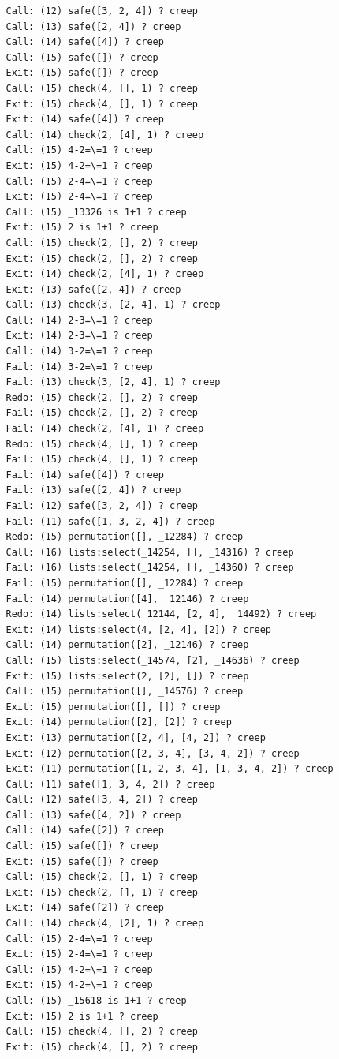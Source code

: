 \documentclass{article}
\begin{document}
\begin{verbatim}
   Call: (12) safe([3, 2, 4]) ? creep
   Call: (13) safe([2, 4]) ? creep
   Call: (14) safe([4]) ? creep
   Call: (15) safe([]) ? creep
   Exit: (15) safe([]) ? creep
   Call: (15) check(4, [], 1) ? creep
   Exit: (15) check(4, [], 1) ? creep
   Exit: (14) safe([4]) ? creep
   Call: (14) check(2, [4], 1) ? creep
   Call: (15) 4-2=\=1 ? creep
   Exit: (15) 4-2=\=1 ? creep
   Call: (15) 2-4=\=1 ? creep
   Exit: (15) 2-4=\=1 ? creep
   Call: (15) _13326 is 1+1 ? creep
   Exit: (15) 2 is 1+1 ? creep
   Call: (15) check(2, [], 2) ? creep
   Exit: (15) check(2, [], 2) ? creep
   Exit: (14) check(2, [4], 1) ? creep
   Exit: (13) safe([2, 4]) ? creep
   Call: (13) check(3, [2, 4], 1) ? creep
   Call: (14) 2-3=\=1 ? creep
   Exit: (14) 2-3=\=1 ? creep
   Call: (14) 3-2=\=1 ? creep
   Fail: (14) 3-2=\=1 ? creep
   Fail: (13) check(3, [2, 4], 1) ? creep
   Redo: (15) check(2, [], 2) ? creep
   Fail: (15) check(2, [], 2) ? creep
   Fail: (14) check(2, [4], 1) ? creep
   Redo: (15) check(4, [], 1) ? creep
   Fail: (15) check(4, [], 1) ? creep
   Fail: (14) safe([4]) ? creep
   Fail: (13) safe([2, 4]) ? creep
   Fail: (12) safe([3, 2, 4]) ? creep
   Fail: (11) safe([1, 3, 2, 4]) ? creep
   Redo: (15) permutation([], _12284) ? creep
   Call: (16) lists:select(_14254, [], _14316) ? creep
   Fail: (16) lists:select(_14254, [], _14360) ? creep
   Fail: (15) permutation([], _12284) ? creep
   Fail: (14) permutation([4], _12146) ? creep
   Redo: (14) lists:select(_12144, [2, 4], _14492) ? creep
   Exit: (14) lists:select(4, [2, 4], [2]) ? creep
   Call: (14) permutation([2], _12146) ? creep
   Call: (15) lists:select(_14574, [2], _14636) ? creep
   Exit: (15) lists:select(2, [2], []) ? creep
   Call: (15) permutation([], _14576) ? creep
   Exit: (15) permutation([], []) ? creep
   Exit: (14) permutation([2], [2]) ? creep
   Exit: (13) permutation([2, 4], [4, 2]) ? creep
   Exit: (12) permutation([2, 3, 4], [3, 4, 2]) ? creep
   Exit: (11) permutation([1, 2, 3, 4], [1, 3, 4, 2]) ? creep
   Call: (11) safe([1, 3, 4, 2]) ? creep
   Call: (12) safe([3, 4, 2]) ? creep
   Call: (13) safe([4, 2]) ? creep
   Call: (14) safe([2]) ? creep
   Call: (15) safe([]) ? creep
   Exit: (15) safe([]) ? creep
   Call: (15) check(2, [], 1) ? creep
   Exit: (15) check(2, [], 1) ? creep
   Exit: (14) safe([2]) ? creep
   Call: (14) check(4, [2], 1) ? creep
   Call: (15) 2-4=\=1 ? creep
   Exit: (15) 2-4=\=1 ? creep
   Call: (15) 4-2=\=1 ? creep
   Exit: (15) 4-2=\=1 ? creep
   Call: (15) _15618 is 1+1 ? creep
   Exit: (15) 2 is 1+1 ? creep
   Call: (15) check(4, [], 2) ? creep
   Exit: (15) check(4, [], 2) ? creep

\end{verbatim}
\end{document}
